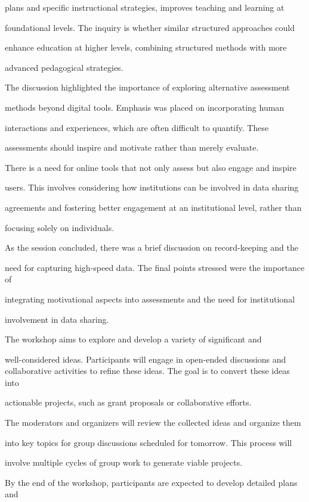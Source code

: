\documentclass[11pt]{article}
\begin{document}
plans and specific instructional strategies, improves teaching and learning at

foundational levels. The inquiry is whether similar structured approaches could

enhance education at higher levels, combining structured methods with more

advanced pedagogical strategies.

The discussion highlighted the importance of exploring alternative assessment

methods beyond digital tools. Emphasis was placed on incorporating human

interactions and experiences, which are often difficult to quantify. These

assessments should inspire and motivate rather than merely evaluate.

There is a need for online tools that not only assess but also engage and inspire

users. This involves considering how institutions can be involved in data sharing

agreements and fostering better engagement at an institutional level, rather than

focusing solely on individuals.

As the session concluded, there was a brief discussion on record-keeping and the

need for capturing high-speed data. The final points stressed were the importance of

integrating motivational aspects into assessments and the need for institutional

involvement in data sharing.

The workshop aims to explore and develop a variety of significant and

well-considered ideas. Participants will engage in open-ended discussions and collaborative activities to refine these ideas. The goal is to convert these ideas into

actionable projects, such as grant proposals or collaborative efforts.

The moderators and organizers will review the collected ideas and organize them

into key topics for group discussions scheduled for tomorrow. This process will

involve multiple cycles of group work to generate viable projects.

By the end of the workshop, participants are expected to develop detailed plans and
\end{document}
